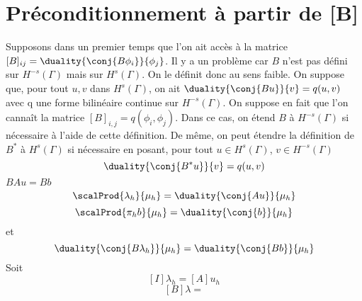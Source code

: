 \documentclass[]{article}
\begin{document}
	\section{Préconditionnement à partir de [B]}
	Supposons dans un premier temps que l'on ait accès à la matrice $[B]_{ij} = \duality{\conj{B \phi_i}}{\phi_j}$. Il y a un problème car $B$ n'est pas défini sur $H^{-s}(\Gamma)$ mais sur $H^{s}(\Gamma)$. On le définit donc au sens faible. On suppose que, pour tout $u,v$ dans $H^s(\Gamma)$, on ait $\duality{\conj{Bu}}{v} = q(u,v)$ avec q une forme bilinéaire continue sur $H^{-s}(\Gamma)$. On suppose en fait que l'on cannaît la matrice $[B]_{i,j} = q(\phi_i,\phi_j)$. Dans ce cas, on étend $B$ à $H^{-s}(\Gamma)$ si nécessaire à l'aide de cette définition. De même, on peut étendre la définition de $B^*$ à $H^s(\Gamma)$ si nécessaire en posant, pour tout $u \in H^{s}(\Gamma)$, $v \in H^{-s}(\Gamma)$
	\[\duality{\conj{B^* u}}{v} = q(u,v)\]
	$BAu = Bb$
		\[\scalProd{\lambda_h}{\mu_h} = \duality{\conj{Au}}{\mu_h}\]
	\[\scalProd{\pi_h b}{\mu_h} = \duality{\conj{b}}{\mu_h}\]
	et 
	\[\duality{\conj{B\lambda_h}}{\mu_h} = \duality{\conj{Bb}}{\mu_h}\]
	Soit 
	\[[I]\lambda_h = [A]u_h\]
	\[[B]\lambda = \]
	
	
\end{document}
